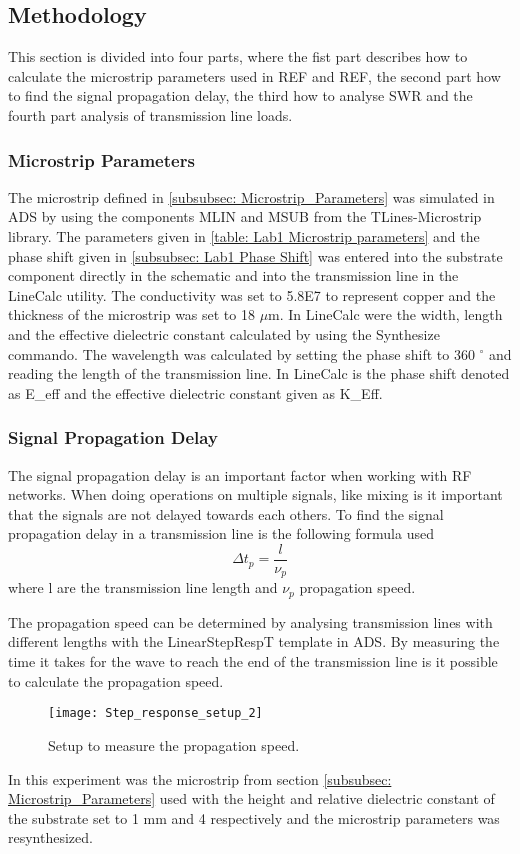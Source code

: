 \documentclass[report.tex]{subfiles}
\begin{document}
\subsection{Methodology}\label{sec:Lab1 methodology}
This section is divided into four parts, where the fist part describes how to calculate the microstrip parameters used in REF and REF, the second part how to find the signal propagation delay, the third how to analyse SWR and the fourth part analysis of transmission line loads.
\subsubsection{Microstrip Parameters}
The microstrip defined in \ref{subsubsec: Microstrip_Parameters} was simulated in ADS by using the components MLIN and MSUB from the TLines-Microstrip library. The parameters given in \ref{table: Lab1 Microstrip parameters} and the phase shift given in \ref{subsubsec: Lab1 Phase Shift} was entered into the substrate component directly in the schematic and into the transmission line in the LineCalc utility. The conductivity was set to 5.8E7 to represent copper and the thickness of the microstrip was set to 18 $\mu$m. In LineCalc were the width, length and the effective dielectric constant calculated by using the Synthesize commando. The wavelength was calculated by setting the phase shift to 360 $^\circ$ and reading the length of the transmission line. In LineCalc is the phase shift denoted as E\_eff and the effective dielectric constant given as K\_Eff.

\subsubsection{Signal Propagation Delay}
The signal propagation delay is an important factor when working with RF networks. When doing operations on multiple signals, like mixing is it important that the signals are not delayed towards each others. To find the signal propagation delay in a transmission line is the following formula used
\begin{equation}\label{eq: Lab1 propagation delay}
	\Delta t_p = \dfrac{l}{\nu_p}
\end{equation}
where l are the transmission line length and $\nu_p$ propagation speed.

The propagation speed can be determined by analysing transmission lines with different lengths with the LinearStepRespT template in ADS. By measuring the time it takes for the wave to reach the end of the transmission line is it possible to calculate the propagation speed.
\begin{figure}[H]
	\texttt{[image: Step\_response\_setup\_2]}
	\caption{Setup to measure the propagation speed.}
\end{figure}
In this experiment was the microstrip from section \ref{subsubsec: Microstrip_Parameters} used with the height and relative dielectric constant of the substrate set to 1 mm and 4 respectively and the microstrip parameters was resynthesized.
\end{document}
